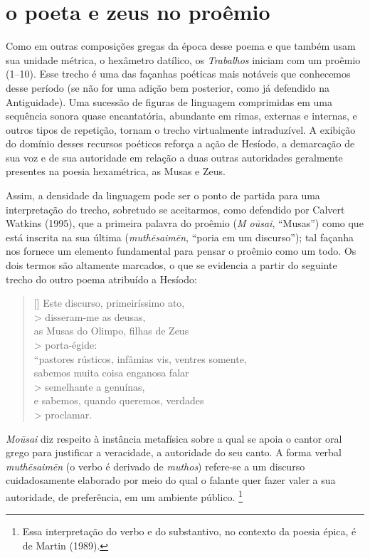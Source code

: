 \section{o poeta e zeus no proêmio}

Como em outras composições gregas da época desse poema e que
também usam sua unidade métrica, o hexâmetro datílico, os
\textit{Trabalhos} iniciam com um proêmio (1--10). Esse trecho é uma das
façanhas poéticas mais notáveis que conhecemos desse período (se não
for uma adição bem posterior, como já defendido na Antiguidade). Uma
sucessão de figuras de linguagem comprimidas em uma sequência sonora
quase encantatória, abundante em rimas, externas e internas, e outros
tipos de repetição, tornam o trecho virtualmente intraduzível. A
exibição do domínio desses recursos poéticos reforça a ação de Hesíodo,
a demarcação de sua voz e de sua autoridade em relação a duas outras 
autoridades geralmente presentes na poesia hexamétrica, as Musas e Zeus.

Assim, a densidade da linguagem pode ser o ponto de partida para uma
interpretação do trecho, sobretudo se aceitarmos, como defendido por
Calvert Watkins (1995), que a primeira palavra do proêmio
(\textit{M o\=usai}, “Musas”) como que está inscrita na sua última
(\textit{muth\=esaim\=en}, “poria em um discurso”); tal façanha nos fornece
um elemento fundamental para pensar o proêmio como um todo. Os dois
termos são altamente marcados, o que se evidencia a partir do seguinte
trecho do outro poema atribuído a Hesíodo: 


\settowidth{\versewidth}{“pastores rústicos, infâmias vis, ventres somente,xx}

\begin{verse}[\versewidth]
  Este discurso, primeiríssimo ato,\\> disseram-me as deusas,\\
  as Musas do Olimpo, filhas de Zeus\\> porta-égide:\\
  “pastores rústicos, infâmias vis, ventres somente,\\
  sabemos muita coisa enganosa falar\\> semelhante a genuínas,\\
  e sabemos, quando queremos, verdades\\> proclamar.
\end{verse}



\textit{Mo\=usai} diz respeito à instância metafísica sobre a qual se
apoia o cantor oral grego para justificar a veracidade, a autoridade do
seu canto. A forma verbal \textit{muth\=esaim\=en} (o verbo é derivado de
\textit{muthos}) refere-se a um discurso cuidadosamente elaborado por
meio do qual o falante quer fazer valer a sua autoridade, de
preferência, em um ambiente público. \footnote{ Essa interpretação do verbo e do
substantivo, no contexto da poesia épica, é de Martin (1989).}

